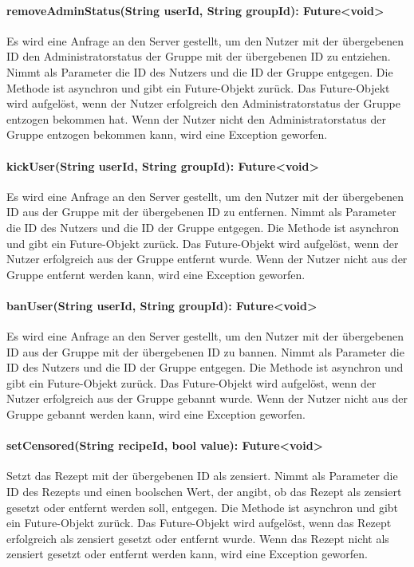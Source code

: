 \documentclass[parskip=full]{scrartcl}
\begin{document}
\paragraph{removeAdminStatus(String userId, String groupId): Future<void>}
Es wird eine Anfrage an den Server gestellt, um den Nutzer mit der übergebenen ID den Administratorstatus der Gruppe mit der übergebenen ID zu entziehen. Nimmt als Parameter die ID des Nutzers und die ID der Gruppe entgegen. Die Methode ist asynchron und gibt ein Future-Objekt zurück. Das Future-Objekt wird aufgelöst, wenn der Nutzer erfolgreich den Administratorstatus der Gruppe entzogen bekommen hat. Wenn der Nutzer nicht den Administratorstatus der Gruppe entzogen bekommen kann, wird eine Exception geworfen.
\paragraph{kickUser(String userId, String groupId): Future<void>}
Es wird eine Anfrage an den Server gestellt, um den Nutzer mit der übergebenen ID aus der Gruppe mit der übergebenen ID zu entfernen. Nimmt als Parameter die ID des Nutzers und die ID der Gruppe entgegen. Die Methode ist asynchron und gibt ein Future-Objekt zurück. Das Future-Objekt wird aufgelöst, wenn der Nutzer erfolgreich aus der Gruppe entfernt wurde. Wenn der Nutzer nicht aus der Gruppe entfernt werden kann, wird eine Exception geworfen.
\paragraph{banUser(String userId, String groupId): Future<void>}
Es wird eine Anfrage an den Server gestellt, um den Nutzer mit der übergebenen ID aus der Gruppe mit der übergebenen ID zu bannen. Nimmt als Parameter die ID des Nutzers und die ID der Gruppe entgegen. Die Methode ist asynchron und gibt ein Future-Objekt zurück. Das Future-Objekt wird aufgelöst, wenn der Nutzer erfolgreich aus der Gruppe gebannt wurde. Wenn der Nutzer nicht aus der Gruppe gebannt werden kann, wird eine Exception geworfen.
\paragraph{setCensored(String recipeId, bool value): Future<void>}
Setzt das Rezept mit der übergebenen ID als zensiert. Nimmt als Parameter die ID des Rezepts und einen boolschen Wert, der angibt, ob das Rezept als zensiert gesetzt oder entfernt werden soll, entgegen. Die Methode ist asynchron und gibt ein Future-Objekt zurück. Das Future-Objekt wird aufgelöst, wenn das Rezept erfolgreich als zensiert gesetzt oder entfernt wurde. Wenn das Rezept nicht als zensiert gesetzt oder entfernt werden kann, wird eine Exception geworfen.
\newpage
\end{document}

